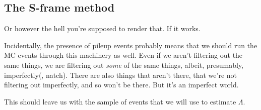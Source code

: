 \subsection{The S-frame method}
Or however the hell you're supposed to render that. If it works.

Incidentally, the presence of pileup events probably means that we should run the MC events through this machinery as well. Even if we aren't filtering out the same things, we are filtering out \textit{some} of the same things, albeit, presumably, imperfectly(, natch). There are also things that aren't there, that we're not filtering out imperfectly, and so won't be there. But it's an imperfect world.

This should leave us with the sample of events that we will use to estimate $\Lambda$.
